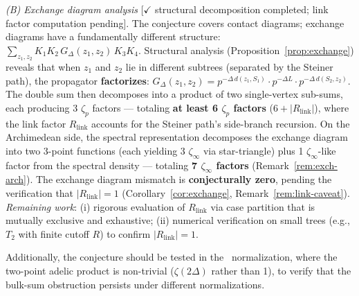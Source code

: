 \documentclass[11pt,a4paper]{article}
\begin{document}
\begin{enumerate}[leftmargin=2em]
    \textit{(B) Exchange diagram analysis} [$\checkmark$ structural decomposition completed; link factor computation pending]. The conjecture covers contact diagrams; exchange diagrams have a fundamentally different structure: $\sum_{z_1, z_2} K_1 K_2 \, G_\Delta(z_1, z_2) \, K_3 K_4$. Structural analysis (Proposition~\ref{prop:exchange}) reveals that when $z_1$ and $z_2$ lie in different subtrees (separated by the Steiner path), the propagator \textbf{factorizes}: $G_\Delta(z_1, z_2) = p^{-\Delta\,d(z_1,S_1)} \cdot p^{-\Delta L} \cdot p^{-\Delta\,d(S_2,z_2)}$. The double sum then decomposes into a product of two single-vertex sub-sums, each producing 3 $\zeta_p$ factors --- totaling \textbf{at least 6 $\zeta_p$ factors} ($6 + |R_{\mathrm{link}}|$), where the link factor $R_{\mathrm{link}}$ accounts for the Steiner path's side-branch recursion. On the Archimedean side, the spectral representation decomposes the exchange diagram into two 3-point functions (each yielding 3 $\zeta_\infty$ via star-triangle) plus 1 $\zeta_\infty$-like factor from the spectral density --- totaling \textbf{7 $\zeta_\infty$ factors} (Remark~\ref{rem:exch-arch}). The exchange diagram mismatch is \textbf{conjecturally zero}, pending the verification that $|R_{\mathrm{link}}| = 1$ (Corollary~\ref{cor:exchange}, Remark~\ref{rem:link-caveat}). \textit{Remaining work}: (i) rigorous evaluation of $R_{\mathrm{link}}$ via case partition that is mutually exclusive and exhaustive; (ii) numerical verification on small trees (e.g., $T_2$ with finite cutoff $R$) to confirm $|R_{\mathrm{link}}| = 1$.
    
    Additionally, the conjecture should be tested in the~\cite{HSYZ20} normalization, where the two-point adelic product is non-trivial ($\zeta(2\Delta)$ rather than 1), to verify that the bulk-sum obstruction persists under different normalizations.


\end{enumerate}
\end{document}
